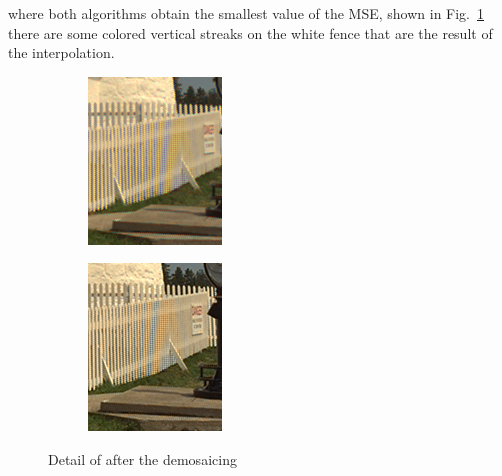 \documentclass[a4paper,oneside]{article}
\begin{document}
where both algorithms obtain the smallest value of the MSE, shown in
Fig.~\ref{fig:artifact} there are some colored vertical streaks on the
white fence that are the result of the interpolation.
\begin{figure}[htbp]
  \centering
  \begin{subfigure}{.5\textwidth}
  \centering
  \includegraphics[width=.8\linewidth]{demosaic_kodim19_artifact}
  \caption{}
\end{subfigure}%
\begin{subfigure}{.5\textwidth}
  \centering
  \includegraphics[width=.8\linewidth]{matlab_demosaic_kodim19_artifact}
  \caption{}
\end{subfigure}
\caption{Detail of  after the demosaicing}
\label{fig:artifact}
\end{figure}
\end{document}
